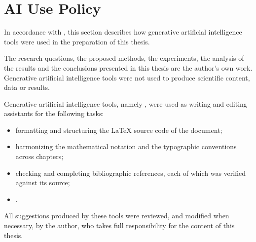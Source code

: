 \chapter*{AI Use Policy}
\label{chap:ai_use_policy}

In accordance with , this section describes how generative artificial intelligence tools were used in the preparation of this thesis.

The research questions, the proposed methods, the experiments, the analysis of the results and the conclusions presented in this thesis are the author's own work.
Generative artificial intelligence tools were not used to produce scientific content, data or results.

Generative artificial intelligence tools, namely , were used as writing and editing assistants for the following tasks:
\begin{itemize}
    \item formatting and structuring the \LaTeX{} source code of the document;
    \item harmonizing the mathematical notation and the typographic conventions across chapters;
    \item checking and completing bibliographic references, each of which was verified against its source;
    \item {}.
\end{itemize}

All suggestions produced by these tools were reviewed, and modified when necessary, by the author, who takes full responsibility for the content of this thesis.
